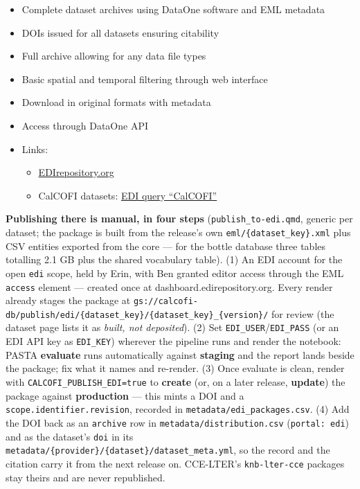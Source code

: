 \documentclass[
  letterpaper,
  DIV=11,
  numbers=noendperiod]{scrreprt}
\providecommand{\tightlist}{%
  \setlength{\itemsep}{0pt}\setlength{\parskip}{0pt}}
\begin{document}
\begin{itemize}
\tightlist
\item
  Complete dataset archives using DataOne software and EML metadata
\item
  DOIs issued for all datasets ensuring citability
\item
  Full archive allowing for any data file types
\item
  Basic spatial and temporal filtering through web interface
\item
  Download in original formats with metadata
\item
  Access through DataOne API
\item
  Links:

  \begin{itemize}
  \tightlist
  \item
    \href{https://edirepository.org}{EDIrepository.org}
  \item
    CalCOFI datasets:
    \href{http://portal.edirepository.org:80/nis/simpleSearch?defType=edismax&q=CalCOFI&fq=-scope:ecotrends&fq=-scope:lter-landsat*&fl=id,packageid,title,author,organization,pubdate,coordinates&debug=false}{EDI
    query ``CalCOFI''}
  \end{itemize}
\end{itemize}

\textbf{Publishing there is manual, in four steps}
(\texttt{publish\_to-edi.qmd}, generic per dataset; the package is built
from the release's own \texttt{eml/\{dataset\_key\}.xml} plus CSV
entities exported from the core --- for the bottle database three tables
totalling 2.1 GB plus the shared vocabulary table). (1) An EDI account
for the open \texttt{edi} scope, held by Erin, with Ben granted editor
access through the EML \texttt{access} element --- created once at
dashboard.edirepository.org. Every render already stages the package at
\texttt{gs://calcofi-db/publish/edi/\{dataset\_key\}/\{dataset\_key\}\_\{version\}/}
for review (the dataset page lists it as \emph{built, not deposited}).
(2) Set \texttt{EDI\_USER}/\texttt{EDI\_PASS} (or an EDI API key as
\texttt{EDI\_KEY}) wherever the pipeline runs and render the notebook:
PASTA \textbf{evaluate} runs automatically against \textbf{staging} and
the report lands beside the package; fix what it names and re-render.
(3) Once evaluate is clean, render with
\texttt{CALCOFI\_PUBLISH\_EDI=true} to \textbf{create} (or, on a later
release, \textbf{update}) the package against \textbf{production} ---
this mints a DOI and a \texttt{scope.identifier.revision}, recorded in
\texttt{metadata/edi\_packages.csv}. (4) Add the DOI back as an
\texttt{archive} row in \texttt{metadata/distribution.csv}
(\texttt{portal:\ edi}) and as the dataset's \texttt{doi} in its
\texttt{metadata/\{provider\}/\{dataset\}/dataset\_meta.yml}, so the
record and the citation carry it from the next release on. CCE-LTER's
\texttt{knb-lter-cce} packages stay theirs and are never republished.
\end{document}
